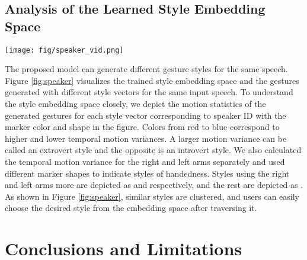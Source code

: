 \documentclass[acmtog]{acmart}
\begin{document}
\subsection{Analysis of the Learned Style Embedding Space} \label{section:speaker_embed}

\begin{figure*}
  \centering
  \texttt{[image: fig/speaker\_vid.png]}
  \caption{Visualization of the style embedding space and sample generation results for the different style vectors. All speaker identities are mapped to style feature vectors , and we visualize the feature vectors in two dimensions by using UMAP \cite{mcinnes2018umap}. The points represent degrees of motion variance via color and degree of handedness by its marker types. We labeled the sampled style vectors according to the overall motion variance and handedness as `IB' for the introvert style of moving both hands similarly, `ER' for the extrovert style of moving the right hand more, and so on. All gesture results are generated from the same speech.}
  \label{fig:speaker}
\end{figure*} 
The proposed model can generate different gesture styles for the same speech. Figure \ref{fig:speaker} visualizes the trained style embedding space and the gestures generated with different style vectors for the same input speech. To understand the style embedding space closely, we depict the motion statistics of the generated gestures for each style vector corresponding to speaker ID with the marker color and shape in the figure. Colors from red to blue correspond to higher and lower temporal motion variances. A larger motion variance can be called an extrovert style and the opposite is an introvert style. We also calculated the temporal motion variance for the right and left arms separately and used different marker shapes to indicate styles of handedness. Styles using the right and left arms more are depicted as  and  respectively, and the rest are depicted as . As shown in Figure \ref{fig:speaker}, similar styles are clustered, and users can easily choose the desired style from the embedding space after traversing it.
 \section{Conclusions and Limitations} \label{sec:discussion}
\end{document}
